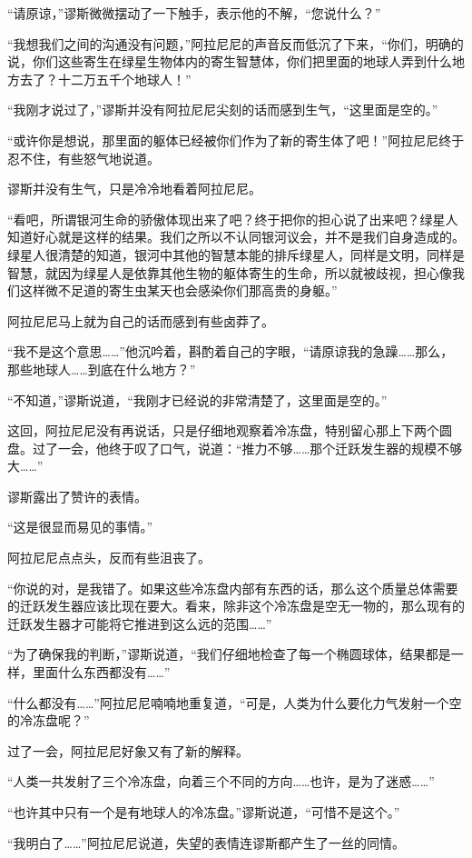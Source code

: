 “请原谅，”谬斯微微摆动了一下触手，表示他的不解，“您说什么？”

“我想我们之间的沟通没有问题，”阿拉尼尼的声音反而低沉了下来，“你们，明确的说，你们这些寄生在绿星生物体内的寄生智慧体，你们把里面的地球人弄到什么地方去了？十二万五千个地球人！”

“我刚才说过了，”谬斯并没有阿拉尼尼尖刻的话而感到生气，“这里面是空的。”

“或许你是想说，那里面的躯体已经被你们作为了新的寄生体了吧！”阿拉尼尼终于忍不住，有些怒气地说道。

谬斯并没有生气，只是冷冷地看着阿拉尼尼。

“看吧，所谓银河生命的骄傲体现出来了吧？终于把你的担心说了出来吧？绿星人知道好心就是这样的结果。我们之所以不认同银河议会，并不是我们自身造成的。绿星人很清楚的知道，银河中其他的智慧本能的排斥绿星人，同样是文明，同样是智慧，就因为绿星人是依靠其他生物的躯体寄生的生命，所以就被歧视，担心像我们这样微不足道的寄生虫某天也会感染你们那高贵的身躯。”

阿拉尼尼马上就为自己的话而感到有些卤莽了。

“我不是这个意思……”他沉吟着，斟酌着自己的字眼，“请原谅我的急躁……那么，那些地球人……到底在什么地方？”

“不知道，”谬斯说道，“我刚才已经说的非常清楚了，这里面是空的。”

这回，阿拉尼尼没有再说话，只是仔细地观察着冷冻盘，特别留心那上下两个圆盘。过了一会，他终于叹了口气，说道：“推力不够……那个迁跃发生器的规模不够大……”

谬斯露出了赞许的表情。

“这是很显而易见的事情。”

阿拉尼尼点点头，反而有些沮丧了。

“你说的对，是我错了。如果这些冷冻盘内部有东西的话，那么这个质量总体需要的迁跃发生器应该比现在要大。看来，除非这个冷冻盘是空无一物的，那么现有的迁跃发生器才可能将它推进到这么远的范围……”

“为了确保我的判断，”谬斯说道，“我们仔细地检查了每一个椭圆球体，结果都是一样，里面什么东西都没有……”

“什么都没有……”阿拉尼尼喃喃地重复道，“可是，人类为什么要化力气发射一个空的冷冻盘呢？”

过了一会，阿拉尼尼好象又有了新的解释。

“人类一共发射了三个冷冻盘，向着三个不同的方向……也许，是为了迷惑……”

“也许其中只有一个是有地球人的冷冻盘。”谬斯说道，“可惜不是这个。”

“我明白了……”阿拉尼尼说道，失望的表情连谬斯都产生了一丝的同情。

